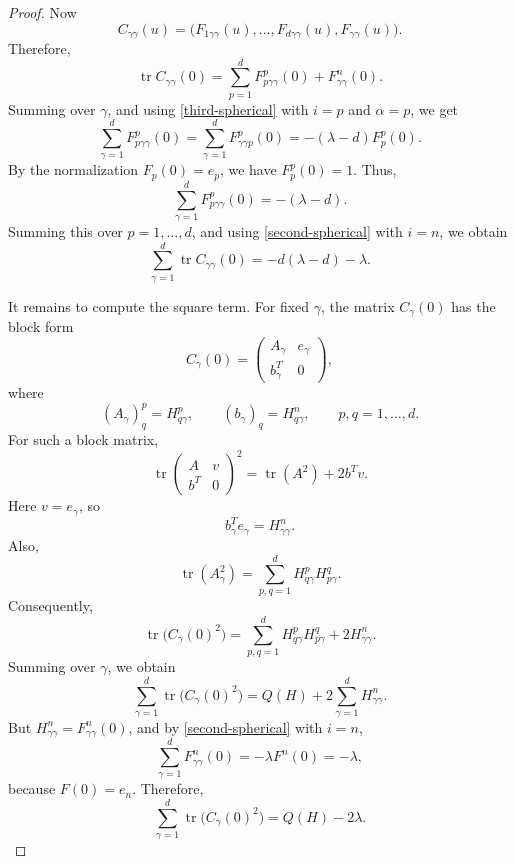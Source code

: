 \documentclass[10pt]{amsart}
\numberwithin{equation}{section}
\theoremstyle{definition}
\DeclareMathOperator{\tr}{tr}
\begin{document}
\begin{proof}
Now
\[
        C_{\gamma\gamma}(u)
        =
        \bigl(F_{1\gamma\gamma}(u),\ldots,F_{d\gamma\gamma}(u),
              F_{\gamma\gamma}(u)\bigr).
\]
Therefore,
\[
        \tr C_{\gamma\gamma}(0)
        =
        \sum_{p=1}^{d}F^p_{p\gamma\gamma}(0)
        +
        F^n_{\gamma\gamma}(0).
\]
Summing over \(\gamma\), and using \eqref{third-spherical} with \(i=p\) and
\(\alpha=p\), we get
\[
        \sum_{\gamma=1}^{d}F^p_{p\gamma\gamma}(0)
        =
        \sum_{\gamma=1}^{d}F^p_{\gamma\gamma p}(0)
        =
        -(\lambda-d)F^p_p(0).
\]
By the normalization \(F_p(0)=e_p\), we have \(F^p_p(0)=1\). Thus,
\[
        \sum_{\gamma=1}^{d}F^p_{p\gamma\gamma}(0)=-(\lambda-d).
\]
Summing this over \(p=1,\ldots,d\), and using \eqref{second-spherical} with
\(i=n\), we obtain
\begin{equation}\label{trace-Cgammagamma}
        \sum_{\gamma=1}^{d}\tr C_{\gamma\gamma}(0)
        =
        -d(\lambda-d)-\lambda.
\end{equation}

It remains to compute the square term. For fixed \(\gamma\), the matrix
\(C_\gamma(0)\) has the block form
\[
        C_\gamma(0)
        =
        \begin{pmatrix}
        A_\gamma & e_\gamma\\
        b_\gamma^T & 0
        \end{pmatrix},
\]
where
\[
        (A_\gamma)^p_q=H^p_{q\gamma},
        \qquad
        (b_\gamma)_q=H^n_{q\gamma},
        \qquad
        p,q=1,\ldots,d.
\]
For such a block matrix,
\[
        \tr
        \begin{pmatrix}
        A & v\\
        b^T & 0
        \end{pmatrix}^{\!2}
        =
        \tr(A^2)+2b^Tv.
\]
Here \(v=e_\gamma\), so
\[
        b_\gamma^Te_\gamma=H^n_{\gamma\gamma}.
\]
Also,
\[
        \tr(A_\gamma^2)=\sum_{p,q=1}^{d}H^p_{q\gamma}H^q_{p\gamma}.
\]
Consequently,
\[
        \tr\bigl(C_\gamma(0)^2\bigr)
        =
        \sum_{p,q=1}^{d}H^p_{q\gamma}H^q_{p\gamma}
        +
        2H^n_{\gamma\gamma}.
\]
Summing over \(\gamma\), we obtain
\[
        \sum_{\gamma=1}^{d}\tr\bigl(C_\gamma(0)^2\bigr)
        =
        Q(H)+2\sum_{\gamma=1}^{d}H^n_{\gamma\gamma}.
\]
But \(H^n_{\gamma\gamma}=F^n_{\gamma\gamma}(0)\), and by
\eqref{second-spherical} with \(i=n\),
\[
        \sum_{\gamma=1}^{d}F^n_{\gamma\gamma}(0)
        =
        -\lambda F^n(0)
        =
        -\lambda,
\]
because \(F(0)=e_n\). Therefore,
\begin{equation}\label{trace-Cgamma-square}
        \sum_{\gamma=1}^{d}\tr\bigl(C_\gamma(0)^2\bigr)
        =
        Q(H)-2\lambda.
\end{equation}


\end{proof}
\end{document}
